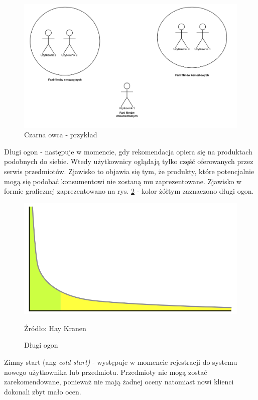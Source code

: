 \begin{figure}
    \centering
    \includegraphics[scale=0.5]{images/grey_sheep.png}
    \caption{Czarna owca - przykład}
    \label{fig:grey-sheep}
\end{figure}

Długi ogon - następuje w momencie, gdy rekomendacja opiera się na produktach podobnych do siebie. Wtedy użytkownicy oglądają tylko część oferowanych przez serwis przedmiotów. Zjawisko to objawia się tym, że produkty, które potencjalnie mogą się podobać konsumentowi nie zostaną mu zaprezentowane. Zjawisko w formie graficznej zaprezentowano na rys. \ref{fig:long-tail} - kolor żółtym zaznaczono długi ogon.

\begin{figure}
    \centering
    \includegraphics[scale=0.4]{images/long_tail.png}
    \caption{Długi ogon}
    Źródło: Hay Kranen
    \label{fig:long-tail}
\end{figure}

Zimny start (ang \textit{cold-start)} - występuje w momencie rejestracji do systemu nowego użytkownika lub przedmiotu. Przedmioty nie mogą zostać zarekomendowane, ponieważ nie mają żadnej oceny natomiast nowi klienci dokonali zbyt mało ocen.

